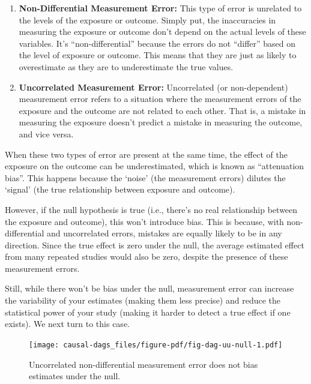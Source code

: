 \documentclass[
  singlecolumn]{report}
\begin{document}
\begin{enumerate}
\def\labelenumi{\arabic{enumi}.}
\item
  \textbf{Non-Differential Measurement Error:} This type of error is
  unrelated to the levels of the exposure or outcome. Simply put, the
  inaccuracies in measuring the exposure or outcome don't depend on the
  actual levels of these variables. It's ``non-differential'' because
  the errors do not ``differ'' based on the level of exposure or
  outcome. This means that they are just as likely to overestimate as
  they are to underestimate the true values.
\item
  \textbf{Uncorrelated Measurement Error:} Uncorrelated (or
  non-dependent) measurement error refers to a situation where the
  measurement errors of the exposure and the outcome are not related to
  each other. That is, a mistake in measuring the exposure doesn't
  predict a mistake in measuring the outcome, and vice versa.
\end{enumerate}

When these two types of error are present at the same time, the effect
of the exposure on the outcome can be underestimated, which is known as
``attenuation bias''. This happens because the `noise' (the measurement
errors) dilutes the `signal' (the true relationship between exposure and
outcome).

However, if the null hypothesis is true (i.e., there's no real
relationship between the exposure and outcome), this won't introduce
bias. This is because, with non-differential and uncorrelated errors,
mistakes are equally likely to be in any direction. Since the true
effect is zero under the null, the average estimated effect from many
repeated studies would also be zero, despite the presence of these
measurement errors.

Still, while there won't be bias under the null, measurement error can
increase the variability of your estimates (making them less precise)
and reduce the statistical power of your study (making it harder to
detect a true effect if one exists). We next turn to this case.

\begin{figure}

{\centering \texttt{[image: causal-dags\_files/figure-pdf/fig-dag-uu-null-1.pdf]}

}

\caption{\label{fig-dag-uu-null}Uncorrelated non-differential
measurement error does not bias estimates under the null.}

\end{figure}
\end{document}
